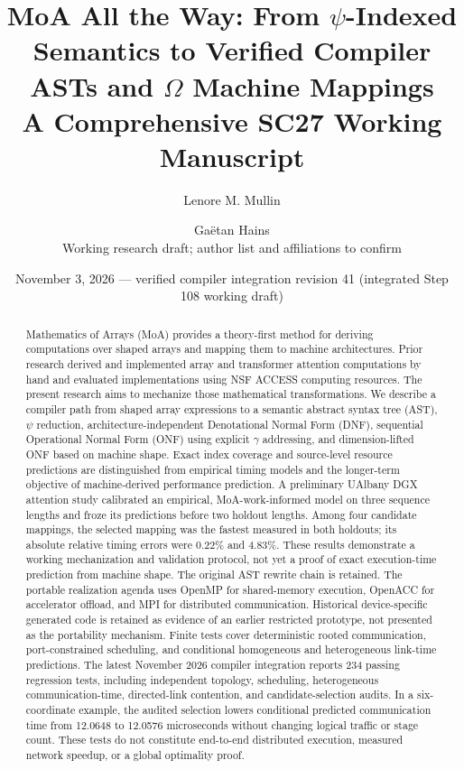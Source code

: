 \documentclass[11pt]{article}
\title{MoA All the Way: From $\psi$-Indexed Semantics to Verified Compiler ASTs and $\Omega$ Machine Mappings\\A Comprehensive SC27 Working Manuscript}
\author{Lenore M. Mullin \and Ga\"etan Hains\\\small Working research draft; author list and affiliations to confirm}
\date{November 3, 2026 --- verified compiler integration revision 41 (integrated Step 108 working draft)}
\begin{document}
\maketitle
\begin{abstract}
Mathematics of Arrays (MoA) provides a theory-first method for deriving computations over shaped arrays and mapping them to machine architectures. Prior research derived and implemented array and transformer attention computations by hand and evaluated implementations using NSF ACCESS computing resources. The present research aims to mechanize those mathematical transformations. We describe a compiler path from shaped array expressions to a semantic abstract syntax tree (AST), $\psi$ reduction, architecture-independent Denotational Normal Form (DNF), sequential Operational Normal Form (ONF) using explicit $\gamma$ addressing, and dimension-lifted ONF based on machine shape. Exact index coverage and source-level resource predictions are distinguished from empirical timing models and the longer-term objective of machine-derived performance prediction. A preliminary UAlbany DGX attention study calibrated an empirical, MoA-work-informed model on three sequence lengths and froze its predictions before two holdout lengths. Among four candidate mappings, the selected mapping was the fastest measured in both holdouts; its absolute relative timing errors were 0.22\% and 4.83\%. These results demonstrate a working mechanization and validation protocol, not yet a proof of exact execution-time prediction from machine shape. The original AST rewrite chain is retained. The portable realization agenda uses OpenMP for shared-memory execution, OpenACC for accelerator offload, and MPI for distributed communication. Historical device-specific generated code is retained as evidence of an earlier restricted prototype, not presented as the portability mechanism. Finite tests cover deterministic rooted communication, port-constrained scheduling, and conditional homogeneous and heterogeneous link-time predictions. The latest November 2026 compiler integration reports 234 passing regression tests, including independent topology, scheduling, heterogeneous communication-time, directed-link contention, and candidate-selection audits. In a six-coordinate example, the audited selection lowers conditional predicted communication time from 12.0648 to 12.0576 microseconds without changing logical traffic or stage count. These tests do not constitute end-to-end distributed execution, measured network speedup, or a global optimality proof.
\end{abstract}
\end{document}
